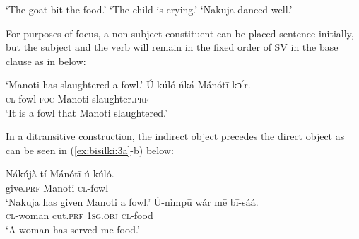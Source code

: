 \documentclass[output=paper,colorlinks,citecolor=brown]{langscibook}
\begin{document}
\ea%
    \label{ex:bisilki:1}
    \jambox*{[SVO]}
    \glt    ‘The goat bit the food.’
    \jambox*{[SV]}
	\glt    ‘The child is crying.’
    \jambox*{[SVA]}
    \glt    ‘Nakuja danced well.’
    \z
\z

For purposes of focus, a non-subject constituent can be placed sentence initially, but the subject and the verb will remain in the fixed order of SV in the base clause as in  below:

\ea%
    \label{ex:bisilki:2}
    \glt    ‘Manoti has slaughtered a fowl.’
    \ex\label{ex:bisilki:2b}
    \gll    Ú-kúló	ńká	Mánótī	kↄ՛r.\\
            \textsc{cl-}fowl	\textsc{foc}	Manoti	slaughter\textsc{.prf}\\
    \glt    ‘It is a fowl that Manoti slaughtered.’
    \z
\z

In a ditransitive construction, the indirect object precedes the direct object as can be seen in (\ref{ex:bisilki:3a}-b) below:


\ea%
    \label{ex:bisilki:3}
    \ea\label{ex:bisilki:3a}
    \gll    Nákújà	tí		Mánótī	ú-kúló.\\
            give\textsc{.prf} {}	Manoti	\textsc{cl-}fowl\\
    \glt    ‘Nakuja has given Manoti a fowl.’
    \ex\label{ex:bisilki:3b}
    \gll    Ú-nìmpū	wár		mē		bī-sáá.\\
            \textsc{cl-}woman	cut\textsc{.prf}	\textsc{1sg.obj}	\textsc{cl-}food\\
    \glt    ‘A woman has served me food.’
    \z
\z
\end{document}
